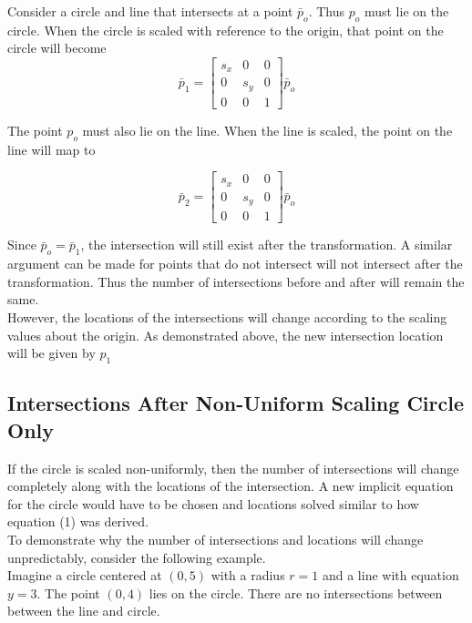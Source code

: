 \documentclass[a4paper,10pt]{scrartcl}
\begin{document}
Consider a circle and line that intersects at a point $\bar p_o$. Thus $p_o$ must lie on the circle. When the circle is scaled with reference to the origin, that point on the circle will become\\

\[\bar p_1 = \begin{bmatrix}
    s_x       & 0 & 0 \\
    0       & s_y & 0 \\
    0       & 0 & 1     
 \end{bmatrix} \bar p_o\]
 
 The point $p_o$ must also lie on the line. When the line is scaled, the point on the line will map to
 
 \[\bar p_2 = \begin{bmatrix}
    s_x       & 0 & 0 \\
    0       & s_y & 0 \\
    0       & 0 & 1     
 \end{bmatrix} \bar p_o\]
 
 
Since $\bar p_o = \bar p_1$, the intersection will still exist after the transformation. A similar argument can be made for points that do not intersect will not intersect after the transformation. Thus
the number of intersections before and after will remain the same.\\

However, the locations of the intersections will change according to the scaling values about the origin. As demonstrated above, the new intersection location will be given by $p_1$\\

\subsection{Intersections After Non-Uniform Scaling Circle Only}

If the circle is scaled non-uniformly, then the number of intersections will change completely along with the locations of the intersection. A new implicit equation for the circle would have to be chosen
and locations solved similar to how equation (1) was derived.\\

To demonstrate why the number of intersections and locations will change unpredictably, consider the following example.\\

Imagine a circle centered at $(0,5)$ with a radius $r = 1$ and a line with equation $y = 3$. The point $(0, 4)$ lies on the circle. There are no intersections between between the line and circle.\\
\end{document}
